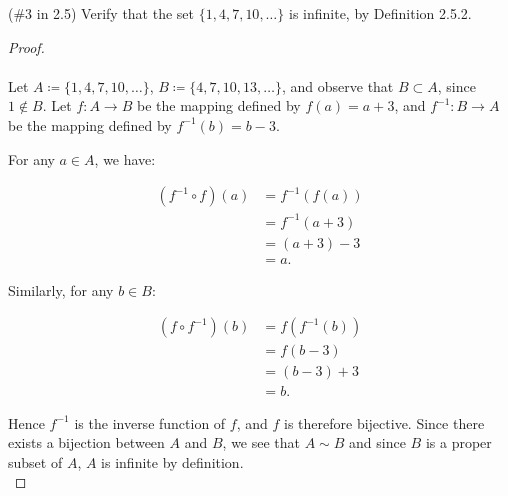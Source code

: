 (\#3 in 2.5) Verify that the set $\{1,4,7,10,\ldots\}$ is infinite, by
Definition 2.5.2.

\begin{proof}\ \\\\
    Let $A \coloneqq \{1, 4, 7, 10, \ldots\}$, 
    $B \coloneqq \{4, 7, 10, 13, \ldots\}$, and observe that $B \subset A$,
    since $1 \notin B$. Let $f:A \to B$ be the mapping defined by
    $f(a) = a + 3$, and $f^{-1}:B \to A$ be the mapping defined by
    $f^{-1}{(b)} = b - 3$.

    For any $a \in A$, we have:

    \begin{align*}
        (f^{-1} \circ f)(a) &= f^{-1}{\left(f(a)\right)} \\
                            &= f^{-1}{\left(a + 3\right)} \\
                            &= (a + 3) - 3 \\
                            &= a.
    \end{align*}

    Similarly, for any $b \in B$:

    \begin{align*}
        (f \circ f^{-1})(b) &= f\left(f^{-1}{(b)}\right) \\
                            &= f\left(b - 3\right) \\
                            &= (b - 3) + 3 \\
                            &= b.
    \end{align*}

    Hence $f^{-1}$ is the inverse function of $f$, and $f$ is therefore
    bijective. Since there exists a bijection between $A$ and $B$, we see that
    $A \sim B$ and since $B$ is a proper subset of $A$, $A$ is infinite by
    definition.
    \ \\
\end{proof}